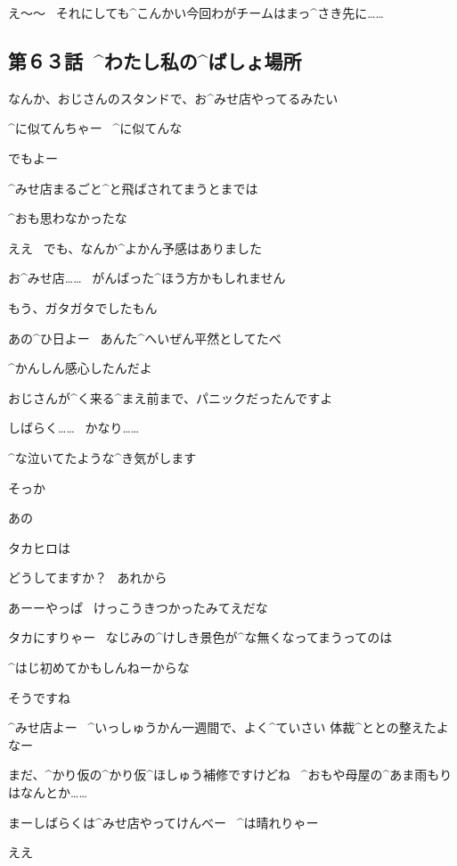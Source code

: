 \Person え〜〜
\ それにしても^{こんかい}{今回}わがチームはまっ^{さき}{先}に……


\subsection{第６３話\ ^{わたし}{私}の^{ばしょ}{場所}}

\page[118]
\Alpha なんか、おじさんのスタンドで、お^{みせ}{店}やってるみたい

\Ojisan ^{に}{似}てんちゃー
\ ^{に}{似}てんな

\Ojisan でもよー

\Ojisan ^{みせ}{店}まるごと^{と}{飛}ばされてまうとまでは

\Ojisan ^{おも}{思}わなかったな

\Alpha ええ
\ でも、なんか^{よかん}{予感}はありました

\page
\Alpha お^{みせ}{店}……
\ がんばった^{ほう}{方}かもしれません

\Alpha もう、ガタガタでしたもん

\Ojisan あの^{ひ}{日}よー
\ あんた^{へいぜん}{平然}としてたべ

\Ojisan ^{かんしん}{感心}したんだよ

\Alpha おじさんが^{く}{来}る^{まえ}{前}まで、パニックだったんですよ

\Alpha しばらく……
\ かなり……

\Alpha ^{な}{泣}いてたような^{き}{気}がします

\page
\Ojisan そっか

\Alpha あの

\Alpha タカヒロは

\Alpha どうしてますか？
\ あれから

\page
\Ojisan あーーやっぱ
\ けっこうきつかったみてえだな

\Ojisan タカにすりゃー
\ なじみの^{けしき}{景色}が^{な}{無}くなってまうってのは

\Ojisan ^{はじ}{初}めてかもしんねーからな

\Alpha そうですね

\page
\Ojisan ^{みせ}{店}よー
\ ^{いっしゅうかん}{一週間}で、よく^{ていさい }{体裁}^{ととの}{整}えたよなー

\Alpha まだ、^{かり}{仮}の^{かり}{仮}^{ほしゅう}{補修}ですけどね
\ ^{おもや}{母屋}の^{あま}{雨}もりはなんとか……

\Ojisan まーしばらくは^{みせ}{店}やってけんべー
\ ^{は}{晴}れりゃー

\Alpha ええ

